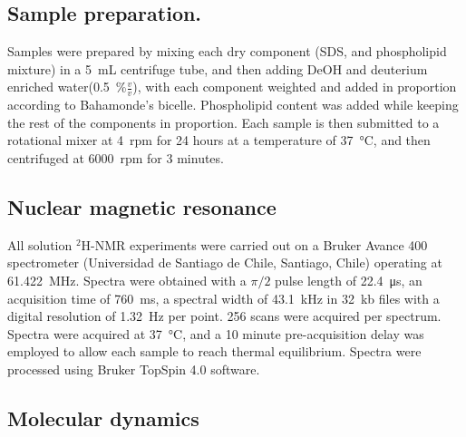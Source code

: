 \documentclass[3p,preprint,review]{elsarticle}
\begin{document}
	\subsection{Sample preparation.}
	Samples were prepared by mixing each dry component (SDS,  and
	phospholipid mixture) in a \SI{5}{mL} centrifuge tube, and then adding DeOH and
	deuterium enriched water(\SI{0.5}{\percent}$\tfrac{v}{v}$), with each
	component
	weighted and added in proportion according to Bahamonde's
	bicelle\cite{Bahamonde-Padilla2013}. Phospholipid content was added while
	keeping the rest of the components in
	proportion. Each sample is then submitted to a
	rotational mixer at \SI{4}{rpm} for 24 hours at a temperature of
	\SI{37}{\celsius}, and then centrifuged at \SI{6000}{rpm} for 3 minutes.
	
	
	\subsection{Nuclear magnetic resonance}
	\label{sec:method_nmr}
	All solution $^2$H-NMR experiments were carried out on a Bruker Avance 400
	spectrometer (Universidad de Santiago de Chile, Santiago, Chile) operating at
	\SI{61.422}{MHz}. Spectra were obtained with a $\pi/2$ pulse length of
	\SI{22.4}{\micro\second}, an acquisition time of \SI{760}{ms}, a spectral
	width of \SI{43.1}{kHz} in \SI{32}{kb} files with a digital resolution of
	\SI{1.32}{Hz} per point.
	256 scans were acquired per spectrum. Spectra
	were acquired at \SI{37}{\celsius}, and a 10 minute pre-acquisition delay was
	employed to allow each sample to reach thermal equilibrium. Spectra were
	processed
	using Bruker TopSpin 4.0 software.
	
	\subsection{Molecular dynamics}
	
\end{document}
